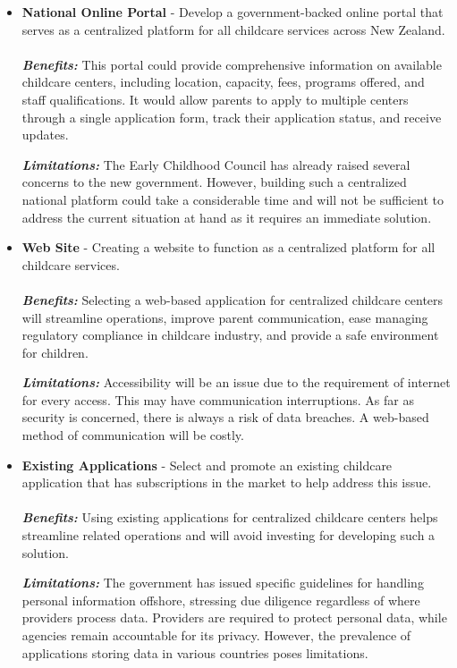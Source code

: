 \begin{itemize}
    \item \textbf{National Online Portal} - Develop a government-backed online portal that serves as a centralized platform for all childcare services across New Zealand.\\ \\
    \emph{\textbf{Benefits:}} This portal could provide comprehensive information on available childcare centers, including location, capacity, fees, programs offered, and staff qualifications. It would allow parents to apply to multiple centers through a single application form, track their application status, and receive updates.

    \emph{\textbf{Limitations:}} The Early Childhood Council has already raised several concerns to the new government. \cite{daycareshortage} However, building such a centralized national platform could take a considerable time and will not be sufficient to address the current situation at hand as it requires an immediate solution.

    \item \textbf{Web Site} - Creating a website to function as a centralized platform for all childcare services.\\ \\
    \emph{\textbf{Benefits:}} Selecting a web-based application for centralized childcare centers will streamline operations, improve parent communication, ease managing regulatory compliance in childcare industry, and provide a safe environment for children.

    \emph{\textbf{Limitations:}} Accessibility will be an issue due to the requirement of internet for every access. This may have communication interruptions. As far as security is concerned, there is always a risk of data breaches. A web-based method of communication will be costly.

    \item \textbf{Existing Applications} - Select and promote an existing childcare application that has subscriptions in the market to help address this issue.\\ \\
    \emph{\textbf{Benefits:}} Using existing applications for centralized childcare centers helps streamline related operations and will avoid investing for developing such a solution.

    \emph{\textbf{Limitations:}} The government has issued specific guidelines for handling personal information offshore, stressing due diligence regardless of where providers process data. Providers are required to protect personal data, while agencies remain accountable for its privacy. \cite{nzdigitalgovernment} However, the prevalence of applications storing data in various countries poses limitations.


\end{itemize}
